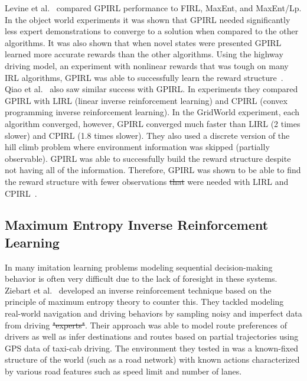 \documentclass[12pt,american]{report}
\providecommand{\DIFaddtex}[1]{{\protect\color{blue}\uwave{#1}}} %
\providecommand{\DIFdeltex}[1]{{\protect\color{red}\sout{#1}}}                      %
\providecommand{\DIFaddbegin}{} %
\providecommand{\DIFaddend}{} %
\providecommand{\DIFdelbegin}{} %
\providecommand{\DIFdelend}{} %
\providecommand{\DIFadd}[1]{\texorpdfstring{\DIFaddtex{#1}}{#1}} %
\providecommand{\DIFdel}[1]{\texorpdfstring{\DIFdeltex{#1}}{}} %
\newcommand{\DIFscaledelfig}{0.5}
\newlength{\DIFdelgraphicswidth} %
\newlength{\DIFdelgraphicsheight} %
\newcommand{\DIFaddincludegraphics}[2][]{{\color{blue}\fbox{\DIFOincludegraphics[#1]{#2}}}} %
\newcommand{\DIFdelincludegraphics}[2][]{%
\sbox{\DIFdelgraphicsbox}{\DIFOincludegraphics[#1]{#2}}%
\settoboxwidth{\DIFdelgraphicswidth}{\DIFdelgraphicsbox} %
\settoboxtotalheight{\DIFdelgraphicsheight}{\DIFdelgraphicsbox} %
\scalebox{\DIFscaledelfig}{%
\parbox[b]{\DIFdelgraphicswidth}{\usebox{\DIFdelgraphicsbox}\\[-\baselineskip] \rule{\DIFdelgraphicswidth}{0em}}\llap{\resizebox{\DIFdelgraphicswidth}{\DIFdelgraphicsheight}{%
\setlength{\unitlength}{\DIFdelgraphicswidth}%
\begin{picture}(1,1)%
\thicklines\linethickness{2pt} %
{\color[rgb]{1,0,0}\put(0,0){\framebox(1,1){}}}%
{\color[rgb]{1,0,0}\put(0,0){\line( 1,1){1}}}%
{\color[rgb]{1,0,0}\put(0,1){\line(1,-1){1}}}%
\end{picture}%
}\hspace*{3pt}}} %
} %
\DeclareRobustCommand{\DIFaddbegin}{\DIFOaddbegin \let\includegraphics\DIFaddincludegraphics} %
\DeclareRobustCommand{\DIFaddend}{\DIFOaddend \let\includegraphics\DIFOincludegraphics} %
\DeclareRobustCommand{\DIFdelbegin}{\DIFOdelbegin \let\includegraphics\DIFdelincludegraphics} %
\DeclareRobustCommand{\DIFdelend}{\DIFOaddend \let\includegraphics\DIFOincludegraphics} %
\begin{document}
Levine et al.~\cite{levine2011nonlinear} compared GPIRL performance to FIRL, MaxEnt, and MaxEnt/Lp. In the object world experiments it was shown that GPIRL needed significantly less expert demonstrations to converge to a solution when compared to the other algorithms. It was also shown that when novel states were presented GPIRL learned more accurate rewards than the other algorithms.  Using the highway driving model, an experiment with nonlinear rewards that was tough on many IRL algorithms, GPIRL was able to successfully learn the reward structure~\cite{levine2011nonlinear}. Qiao et al.~\cite{qiao2011inverse} also saw similar success with GPIRL.  In experiments they compared GPIRL with LIRL (linear inverse reinforcement learning) and CPIRL (convex programming inverse reinforcement learning). In the GridWorld experiment, each algorithm converged, however, GPIRL converged much faster than LIRL (2 times slower) and CPIRL (1.8 times slower).  They also used a discrete version of the hill climb problem where  environment information was skipped (partially observable).  GPIRL was able to successfully build the reward structure despite not having all of the information. Therefore, GPIRL was shown to be able to find the reward structure with fewer observations \DIFdelbegin \DIFdel{that }\DIFdelend \DIFaddbegin \DIFadd{than }\DIFaddend were needed with LIRL and CPIRL~\cite{qiao2011inverse}.


\subsection{Maximum Entropy Inverse Reinforcement Learning}
\label{sec:maxentirl}
In many imitation learning problems modeling sequential decision-making behavior is often very difficult due to the lack of foresight in these systems. Ziebart et al.~\cite{ziebart2008maximum} developed an inverse reinforcement technique based on the principle of maximum entropy theory to counter this.  They tackled modeling real-world navigation and driving behaviors by sampling noisy and imperfect data from driving \DIFdelbegin \DIFdel{"experts"}\DIFdelend \DIFaddbegin \DIFadd{``experts''}\DIFaddend .  Their approach was able to model route preferences of drivers as well as infer destinations and routes based on partial trajectories using GPS data of taxi-cab driving.  The environment they tested in was a known-fixed structure of the world (such as a road network) with known actions characterized by various road features such as speed limit and number of lanes.
\end{document}
